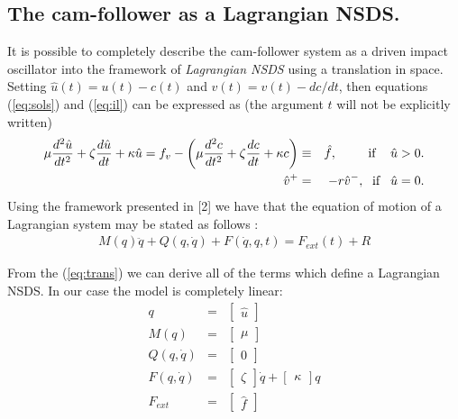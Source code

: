 \subsection{The cam-follower as a Lagrangian NSDS.}
 It is possible to completely describe the cam-follower system as a
 driven impact oscillator into the framework of \textit{Lagrangian NSDS} using a
translation in space. Setting $\hat u(t)=u(t)-c(t)$ and $\hat
v(t)= v(t)-dc/dt$, then equations (\ref{eq:sols}) and
(\ref{eq:il}) can be expressed as (the argument $t$ will not be
explicitly written)
\begin{eqnarray}
  \label{eq:trans}
  \mu\frac{d^2\hat u}{dt^2}+\zeta\frac{d\hat u}{dt}+\kappa
  \hat u=f_{v}-\left(\mu\frac{d^2c}{dt^2}+\zeta\frac{dc}{dt}+\kappa
  c\right)&\equiv &\hat f,  \; \text{\hspace{6.5mm} \text{if} \hspace{3mm}$\hat u >
 0$.}\\
\hat v^+&=&-r \hat v^- , \; \text{ \text{if}\hspace{3mm}$\hat
u=0$.}
\end{eqnarray}
Using the framework presented in [2] we have that the equation of
motion of a Lagrangian system may be stated as follows :
\begin{eqnarray}
  \label{eq:lag1}
  M(q)\ddot q + Q(q,\dot q) + F(\dot q, q , t) = F_{ext}(t) + R
\end{eqnarray}

From the (\ref{eq:trans}) we can derive all of the terms which
define a Lagrangian NSDS. In our case the model is completely
linear:
\begin{eqnarray}
  \nonumber
  q&=& \left[\begin{array}{c}  \hat u  \end{array}\right]    \\
  \nonumber
  M(q)&=&  \left[\begin{array}{c} \mu  \end{array}\right] \\
  \label{eq:lag2}
  Q(q,\dot q )& = &\left[\begin{array}{c} 0  \end{array}\right]  \\
  \nonumber
  F(q, \dot q ) &=&  \left[\begin{array}{c} \zeta \end{array}\right] \dot q +  \left[\begin{array}{c} \kappa  \end{array}\right] q\\
  \nonumber
  F_{ext}& = & \left[\begin{array}{c} \hat f \end{array}\right]
\end{eqnarray}

